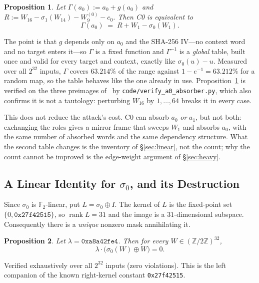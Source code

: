 \documentclass[11pt,a4paper]{article}
\newtheorem{proposition}{Proposition}
\newcommand{\sig}[1]{\sigma_{#1}}
\begin{document}
\begin{proposition}
\label{prop:a0absorber}
Let $\Gamma(a_0) := a_0 + g(a_0)$ and
$R := W_{16} - \sig{1}(W_{14}) - W_9^{(0)} - c_0$.  Then C0 is
equivalent to
\[
  \Gamma(a_0) \;=\; R + W_1 - \sig{0}(W_1).
\]
\end{proposition}

The point is that $g$ depends only on $a_0$ and the SHA-256 IV---no context
word and no target enters it---so $\Gamma$ is a fixed function and $\Gamma^{-1}$
is a \emph{global} table, built once and valid for every target and context,
exactly like $\sig{0}(u)-u$.  Measured over all $2^{32}$ inputs, $\Gamma$ covers
$63.214\%$ of the range against $1-e^{-1}=63.212\%$ for a random map, so the
table behaves like the one already in use.  Proposition~\ref{prop:a0absorber} is
verified on the three preimages of~\cite[Table~2]{Basra2026R19} by
\texttt{code/verify\_a0\_absorber.py}, which also confirms it is not a tautology:
perturbing $W_{16}$ by $1,\ldots,64$ breaks it in every case.

This does not reduce the attack's cost.  C0 can absorb $a_0$ \emph{or}
$a_1$, but not both: exchanging the roles gives a mirror frame that sweeps
$W_1$ and absorbs $a_0$, with the same number of absorbed words and the
same dependency structure.  What the second table changes is the inventory
of \S\ref{sec:linear}, not the count; why the count cannot be improved is
the edge-weight argument of \S\ref{sec:heavy}.

\subsection{A Linear Identity for \texorpdfstring{$\sigma_0$}{sigma0}, and its Destruction}
\label{sec:leftnull}

Since $\sig{0}$ is $\mathbb{F}_2$-linear, put $L = \sig{0}\oplus I$.  The kernel of
$L$ is the fixed-point set $\{0,\texttt{0x27f42515}\}$, so $\operatorname{rank}L = 31$
and the image is a $31$-dimensional subspace.  Consequently there is a
\emph{unique} nonzero mask annihilating it.

\begin{proposition}
\label{prop:leftnull}
Let $\lambda = \texttt{0xa8a42fe4}$.  Then for every $W\in(\mathbb{Z}/2\mathbb{Z})^{32}$,
\[
  \lambda \cdot \bigl(\sig{0}(W)\oplus W\bigr) = 0 .
\]
\end{proposition}

Verified exhaustively over all $2^{32}$ inputs (zero violations).  This is the left
companion of the known right-kernel constant \texttt{0x27f42515}.
\end{document}
